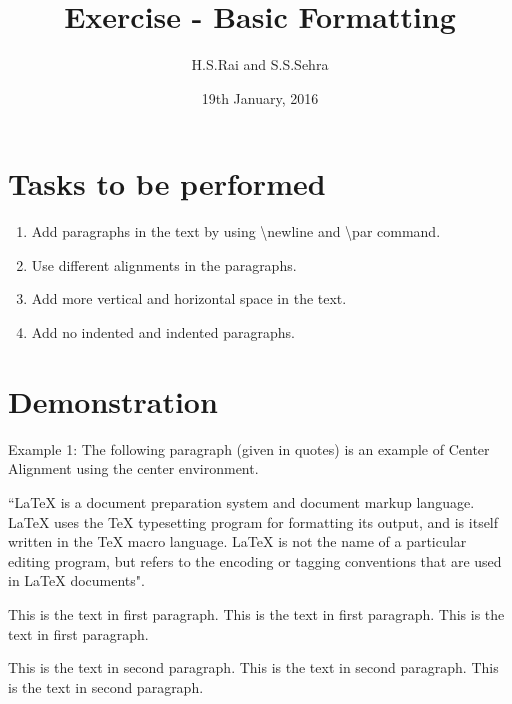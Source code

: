 \documentclass{article}
\title{Exercise - Basic Formatting}
\author{H.S.Rai and S.S.Sehra}
\date{19th January, 2016}
\begin{document}
\maketitle
\section*{Tasks to be performed}

\begin{enumerate}
\item Add paragraphs in the text by using  \textbackslash newline and \textbackslash par command.

\item Use different alignments in  the paragraphs.

\item Add more vertical and horizontal space in the text.

\item  Add no indented and indented paragraphs.
\end{enumerate}



\section*{Demonstration}
\begin{center}
Example 1: The following paragraph (given in quotes) is an example of Center Alignment using the center environment. 

``LaTeX is a document preparation system and document markup language. LaTeX uses the TeX typesetting program for formatting its output, and is itself written in the TeX macro language. LaTeX is not the name of a particular editing program, but refers to the encoding or tagging conventions that are used in LaTeX documents".
\end{center}

\vspace{2em} %

\setlength{\parindent}{10ex}

This is the text in first paragraph. This is the text in first 
paragraph. This is the text in first paragraph. \par
\noindent %
This is the text in second paragraph. This is the text in second 
paragraph. This is the text in second paragraph.
\end{document}
